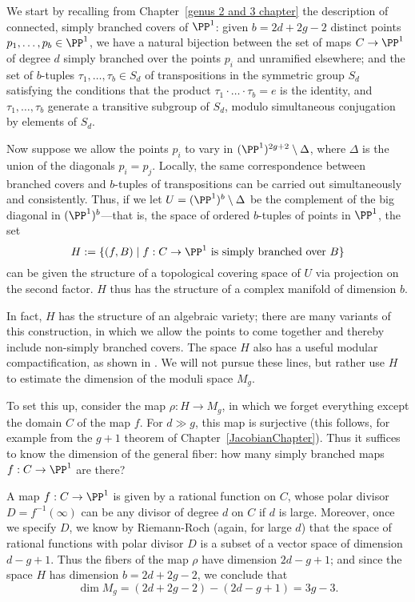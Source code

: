 We start by recalling from Chapter~\ref{genus 2 and 3 chapter} the description of connected, simply branched covers of $\PP^1$: given $b = 2d + 2g - 2$ distinct points $p_1,\dots,p_b \in \PP^1$, we have a natural bijection between the set of maps $C \to \PP^1$ of degree $d$ simply branched over the points $p_i$ and unramified elsewhere; and the set of $b$-tuples $\tau_1, \dots, \tau_b \in S_d$ of transpositions in the symmetric group $S_d$
satisfying the conditions that the product $\tau_1\cdot \dots \cdot \tau_b = e$ is the identity, and $\tau_1, \dots, \tau_b$ generate a transitive subgroup of $S_d$, modulo simultaneous conjugation by elements of $S_d$. 

Now suppose we allow the points $p_i$ to vary in $(\PP^1)^{2g+2} \setminus \Delta$, where $\Delta$ is the union of the 
diagonals $p_i=p_j$. Locally, the same correspondence between branched covers and $b$-tuples of transpositions can be carried out simultaneously and consistently. Thus, if we let $U = (\PP^1)^b \setminus \Delta$ be the complement of the big diagonal in $(\PP^1)^b$---that is, the space of ordered $b$-tuples of points in $\PP^1$, the set
$$
H := \{ (f, B) \mid f : C \to \PP^1 \text{ is simply branched over } B \}
$$
can be given the structure of a topological covering space of $U$ via projection on the second factor. $H$ thus has the structure of a complex manifold of dimension $b$.

In fact, $H$ has the structure of an algebraic variety; there are many variants of this construction, in which we allow the points to come together and thereby include non-simply branched covers. The space $H$ also has a useful modular compactification, as shown in \cite{Harris-Mumford-Moduli}. We will not pursue these lines, but rather use $H$
to estimate the dimension of the moduli space $M_g$.

To set this up, consider the map $\rho : H \to M_g$, in which we forget everything except the domain $C$ of the map $f$. For $d \gg g$, this map is surjective (this follows, for example from the $g+1$ theorem of Chapter~\ref{JacobianChapter}). Thus it suffices to know the dimension of the general fiber: how many simply branched maps $f : C \to \PP^1$ are there?

A map $f : C \to \PP^1$ is given by a rational function on $C$, whose polar divisor $D = f^{-1}(\infty)$ can be any divisor of degree $d$ on $C$ if $d$ is large. Moreover, once we specify $D$, we know by Riemann-Roch (again, for large $d$) that the space of rational functions with polar divisor $D$ is a subset of a vector space of dimension $d-g+1$. Thus the fibers of the map $\rho$ have dimension $2d-g+1$; and since the space $H$ has dimension $b = 2d+2g-2$, we conclude that
$$
\dim M_g = (2d+2g-2)-(2d-g+1) = 3g-3.
$$

